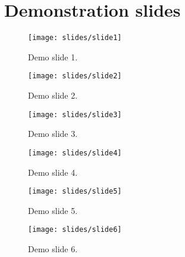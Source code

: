 \chapter{Demonstration slides}

\begin{figure}
    \texttt{[image: slides/slide1]}
    \caption{Demo slide 1.}
    \label{slide1}
\end{figure}


\begin{figure}
    \texttt{[image: slides/slide2]}
    \caption{Demo slide 2.}
    \label{slide2}
\end{figure}


\begin{figure}
    \texttt{[image: slides/slide3]}
    \caption{Demo slide 3.}
    \label{slide3}
\end{figure}


\begin{figure}
    \texttt{[image: slides/slide4]}
    \caption{Demo slide 4.}
    \label{slide4}
\end{figure}

\begin{figure}
    \texttt{[image: slides/slide5]}
    \caption{Demo slide 5.}
    \label{slide5}
\end{figure}


\begin{figure}
    \texttt{[image: slides/slide6]}
    \caption{Demo slide 6.}
    \label{slide6}
\end{figure}

